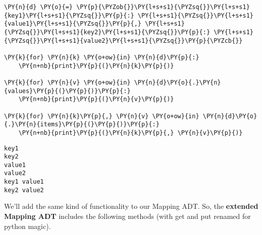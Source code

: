 \begin{Verbatim}[commandchars=\\\{\}]
\PY{n}{d} \PY{o}{=} \PY{p}{\PYZob{}}\PY{l+s+s1}{\PYZsq{}}\PY{l+s+s1}{key1}\PY{l+s+s1}{\PYZsq{}}\PY{p}{:} \PY{l+s+s1}{\PYZsq{}}\PY{l+s+s1}{value1}\PY{l+s+s1}{\PYZsq{}}\PY{p}{,} \PY{l+s+s1}{\PYZsq{}}\PY{l+s+s1}{key2}\PY{l+s+s1}{\PYZsq{}}\PY{p}{:} \PY{l+s+s1}{\PYZsq{}}\PY{l+s+s1}{value2}\PY{l+s+s1}{\PYZsq{}}\PY{p}{\PYZcb{}}

\PY{k}{for} \PY{n}{k} \PY{o+ow}{in} \PY{n}{d}\PY{p}{:}
    \PY{n+nb}{print}\PY{p}{(}\PY{n}{k}\PY{p}{)}

\PY{k}{for} \PY{n}{v} \PY{o+ow}{in} \PY{n}{d}\PY{o}{.}\PY{n}{values}\PY{p}{(}\PY{p}{)}\PY{p}{:}
    \PY{n+nb}{print}\PY{p}{(}\PY{n}{v}\PY{p}{)}

\PY{k}{for} \PY{n}{k}\PY{p}{,} \PY{n}{v} \PY{o+ow}{in} \PY{n}{d}\PY{o}{.}\PY{n}{items}\PY{p}{(}\PY{p}{)}\PY{p}{:}
    \PY{n+nb}{print}\PY{p}{(}\PY{n}{k}\PY{p}{,} \PY{n}{v}\PY{p}{)}
\end{Verbatim}

\begin{Verbatim}
key1
key2
value1
value2
key1 value1
key2 value2
\end{Verbatim}


We'll add the same kind of functionality to our Mapping ADT.  So, the \textbf{extended Mapping ADT} includes the following methods (with get and put renamed for python magic).

